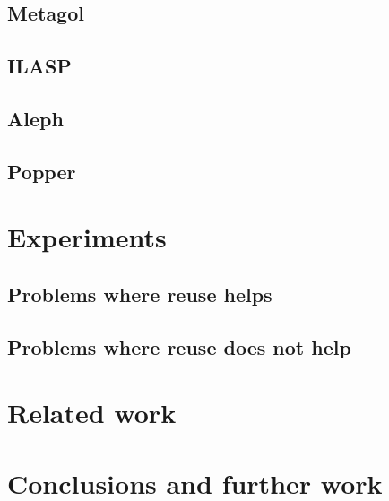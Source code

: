 \documentclass{article}
\theoremstyle{definition}
\begin{document}
\subsection{Metagol}
\subsection{ILASP}
\subsection{Aleph}
\subsection{Popper}



\section{Experiments}
\subsection{Problems where reuse helps}
\subsection{Problems where reuse does not help}



\section{Related work}



\section{Conclusions and further work}








\end{document}
